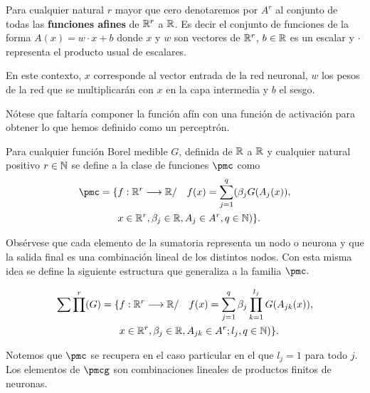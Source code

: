     Para cualquier natural $r$ mayor que cero  denotaremos por $A^r$ al conjunto de todas 
    las \textbf{funciones afines} de $\mathbb{R}^r$ a $\mathbb{R}$. Es decir el conjunto de funciones de la forma 
    $A(x) = w \cdot x + b$ donde $x$ y $w$ son vectores de $\mathbb{R}^r$,  $b \in \mathbb{R}$ es un escalar y $\cdot$ representa el producto 
    usual de escalares.  
    


En este contexto, $x$ corresponde al vector entrada de la red neuronal, $w$ los pesos de la red
que se multiplicarán con $x$ en la capa intermedia y $b$ el sesgo. 

Nótese que faltaría componer la función afín con una función de activación para obtener lo que hemos definido 
como un perceptrón. 

\begin{definicion} 
    Para cualquier función Borel medible $G$, definida de $\mathbb{R}$ a $\mathbb{R}$ y cualquier natural positivo
    $r \in \mathbb{N}$ se define a la clase de funciones $\pmc$ como 
    \begin{equation}
        \begin{split}
        \pmc = 
        \{ 
            & f: \R ^r \longrightarrow \R / \quad
            f(x)=\sum_{j = 1} ^q (
            \beta_j G(A_{j}(x)), \\
            & x  \in \R ^r, \beta_j \in \R, A_{j}\in A^r,q \in \N
            )
        \}.
        \end{split}
    \end{equation}
\end{definicion}


Obsérvese que cada elemento de la sumatoria representa un nodo o neurona y que la salida final 
es una combinación lineal de los distintos nodos. Con esta misma idea 
se define la siguiente estructura que generaliza a la familia $\pmc.$  
   
\begin{definicion} \label{def:articulo_abstracción_rrnn}
    
    \begin{equation} 
        \begin{split}
        \sum \prod^r(G) = \{ 
        &f: \mathbb{R}^r \longrightarrow \mathbb{R} / \quad
        f(x) = \sum_{j = 1} ^q  \beta_j \prod_{k=1}^{l_j}
        G(A_{jk}(x)), \\
        &x  \in \mathbb{R}^r, \beta_j \in \mathbb{R}, A_{jk}\in A^r; l_j,q \in \mathbb{N}
        )
        \}.
    \end{split}
    \end{equation}  

    Notemos que $\pmc$ se recupera en el caso particular en el que $l_j = 1$ para todo $j$.
    Los elementos de $\pmcg$ son combinaciones lineales de productos finitos de neuronas. 

\end{definicion}


